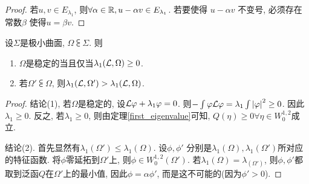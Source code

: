 \begin{proof}
    若$u,v \in E_{\lambda_1}$, 则$\forall \alpha \in {\mathbb{R}}, u-\alpha v \in E_{\lambda_1}$. 若要使得 $u-\alpha v$ 不变号, 必须存在常数$\beta$ 使得$u=\beta v$.
\end{proof}

\begin{proposition} \label{strict_le}
    设$\Sigma$是极小曲面, $\Omega \subsub \Sigma$.  则
    \begin{enumerate}
        \item $\Omega$是稳定的当且仅当$\lambda_1(\mathcal{L},\Omega) \ge 0$.
        \item 若$\Omega' \subsub \Omega$, 则$\lambda_1(\mathcal{L}, \Omega') > \lambda_1(\mathcal{L}, \Omega)$.
    \end{enumerate}
\end{proposition}
\begin{proof}
    结论(1), 若$\Omega$是稳定的, 设$\mathcal{L}{\varphi}+\lambda_1{\varphi}=0$. 则$-\int{\varphi}\mathcal{L} {\varphi}=\lambda_1\int{\left | {\varphi}\right |}^2 \ge 0$. 因此$\lambda_1 \ge 0$.   反之, 若$\lambda_1 \ge 0$, 则由定理\eqref{first_eigenvalue}可知, $Q(\eta) \ge 0 \forall \eta \in W^{1,2}_0$成立.
    \par 结论(2). 首先显然有$\lambda_1(\Omega') \le \lambda_1(\Omega)$. 设$\phi,\phi'$ 分别是$\lambda_1(\Omega),\lambda_1(\Omega')$所对应的特征函数. 将$\phi$零延拓到$\Omega'$上, 则$\phi \in W^{1,2}_0(\Omega')$. 若$\lambda_1(\Omega)=\lambda_(\Omega')$, 则$\phi,\phi'$都取到泛函$Q$在$\Omega'$上的最小值, 因此$\phi=\alpha \phi'$, 而是这不可能的(因为$\phi' >0$).
\end{proof}

